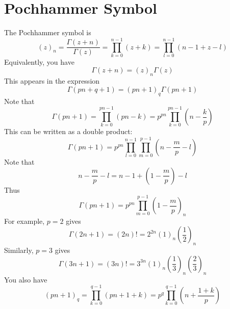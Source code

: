 \section{Pochhammer Symbol}
The Pochhammer symbol is
\begin{equation}
    \left(z\right)_{n} = \frac{\Gamma(z + n)}{\Gamma(z)} = \prod_{k = 0}^{n-1} \left(z + k\right) = \prod_{l = 0}^{n-1} \left(n - 1 + z - l\right)
\end{equation}
Equivalently, you have
\begin{equation}
    \Gamma(z + n) = \left(z\right)_{n} \Gamma(z)
\end{equation}
This appears in the expression
\begin{equation}
    \Gamma\left(pn+q+1\right) = \left(pn+1\right)_{q} \Gamma\left(pn+1\right)
\end{equation}
Note that
\begin{equation}
    \Gamma\left(pn+1\right) = \prod_{k = 0}^{pn - 1} \left(pn - k \right) = p^{pn} \prod_{k = 0}^{pn-1} \left(n - \frac{k}{p}\right)
\end{equation}
This can be written as a double product:
\begin{equation}
    \Gamma\left(pn+1\right) = p^{pn} \prod_{l = 0}^{n - 1} \prod_{m = 0}^{p-1} \left(n - \frac{m}{p} - l\right)
\end{equation}
Note that
\begin{equation}
    n - \frac{m}{p} - l = n - 1 + \left(1 - \frac{m}{p}\right) - l
\end{equation}
Thus
\begin{equation}
    \Gamma\left(pn+1\right) = p^{pn} \prod_{m = 0}^{p-1} \left(1 - \frac{m}{p}\right)_{n}
\end{equation}
For example, $p = 2$ gives
\begin{equation}
    \Gamma(2n+1) = (2n)! = 2^{2n} (1)_{n} \left(\frac{1}{2}\right)_{n}
\end{equation}
Similarly, $p = 3$ gives
\begin{equation}
    \Gamma(3n+1) = (3n)! = 3^{3n} (1)_{n} \left(\frac{1}{3}\right)_{n} \left(\frac{2}{3}\right)_{n}
\end{equation}
You also have
\begin{equation}
    \left(pn+1\right)_{q} = \prod_{k = 0}^{q-1} \left(pn + 1 + k\right) = p^{q} \prod_{k=0}^{q-1} \left(n + \frac{1 + k}{p}\right)
\end{equation}
